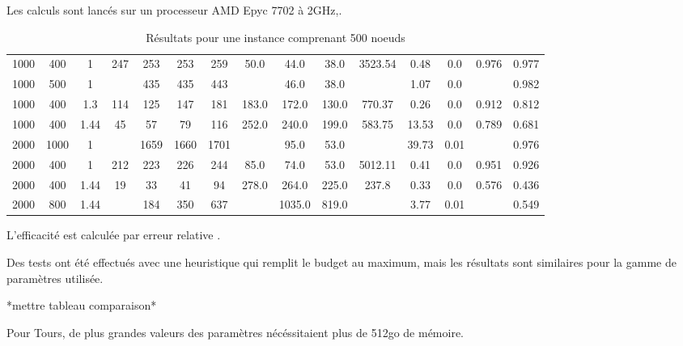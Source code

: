 \documentclass[a4paper,12pt,french]{article}
\begin{document}
Les calculs sont lancés sur un processeur AMD Epyc 7702 à 2GHz,.

\begin{table}[h]
\centering
\caption{Résultats pour une instance comprenant 500 noeuds}
\vspace{0.5cm}
\begin{tabular}{|c|c|c|c|c|c|c|c|c|c|c|c|c|c|c|}
\hline
1000 & 400 & 1 & 247 & 253 & 253 & 259 & 50.0 & 44.0 & 38.0 & 3523.54 & 0.48 & 0.0 & 0.976 & 0.977 \\
1000 & 500 & 1 &  & 435 & 435 & 443 &  & 46.0 & 38.0 &  & 1.07 & 0.0 &  & 0.982 \\
1000 & 400 & 1.3 & 114 & 125 & 147 & 181 & 183.0 & 172.0 & 130.0 & 770.37 & 0.26 & 0.0 & 0.912 & 0.812 \\
1000 & 400 & 1.44 & 45 & 57 & 79 & 116 & 252.0 & 240.0 & 199.0 & 583.75 & 13.53 & 0.0 & 0.789 & 0.681 \\
2000 & 1000 & 1 &  & 1659 & 1660 & 1701 &  & 95.0 & 53.0 &  & 39.73 & 0.01 &  & 0.976 \\
2000 & 400 & 1 & 212 & 223 & 226 & 244 & 85.0 & 74.0 & 53.0 & 5012.11 & 0.41 & 0.0 & 0.951 & 0.926 \\
2000 & 400 & 1.44 & 19 & 33 & 41 & 94 & 278.0 & 264.0 & 225.0 & 237.8 & 0.33 & 0.0 & 0.576 & 0.436 \\
2000 & 800 & 1.44 &  & 184 & 350 & 637 &  & 1035.0 & 819.0 &  & 3.77 & 0.01 &  & 0.549 \\
 \hline 
 \end{tabular}
\end{table}

L'efficacité est calculée par erreur relative \cite{erreur_relative}.

Des tests ont été effectués avec une heuristique qui remplit le budget au maximum, mais les résultats sont similaires pour la gamme de paramètres utilisée.

*mettre tableau comparaison*

Pour Tours, de plus grandes valeurs des paramètres nécéssitaient plus de 512go de mémoire.
\end{document}
